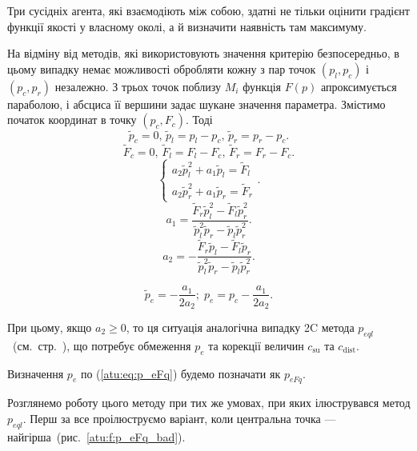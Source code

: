 Три сусідніх агента, які взаємодіють між собою, здатні не тільки оцінити градієнт
функції якості у власному околі, а й визначити наявність там
максимуму.

На відміну від методів, які використовують значення критерію безпосередньо, в
цьому випадку немає можливості обробляти кожну з пар точок $(p_l, p_c)$ і
$(p_c, p_r)$ незалежно. З трьох точок поблизу $M_{i}$ функція $F(p)$
апроксимується параболою, і абсциса її вершини задає шукане значення параметра.
Змістимо початок координат в точку
$(p_c, F_c)$. Тоді
%
\[
  \tilde{p}_c = 0, \,
  \tilde{p}_l = p_l - p_c, \,
  \tilde{p}_r = p_r - p_c.
\]
%
\[
  \tilde{F}_c = 0, \,
  \tilde{F}_l = F_l - F_c, \,
  \tilde{F}_r = F_r - F_c.
\]
%
\[
  \left\{
    \begin{array}{l}
      a_2 \tilde{p}_l^2 + a_1 \tilde{p}_l  = \tilde{F}_l
      \\
      a_2 \tilde{p}_r^2 + a_1 \tilde{p}_r  = \tilde{F}_r
    \end{array}
  \right. .
\]
%
\[
  a_1 = \frac{\tilde{F}_r \tilde{p}_l^2 - \tilde{F}_l \tilde{p}_r^2 }
             { \tilde{p}_l^2 \tilde{p}_r  - \tilde{p}_l \tilde{p}_r^2 }.
\]
%
\[
  a_2 = - \frac{\tilde{F}_r \tilde{p}_l - \tilde{F}_l \tilde{p}_r }
               { \tilde{p}_l^2 \tilde{p}_r  - \tilde{p}_l \tilde{p}_r^2 }.
\]

\begin{equation}
  \tilde{p}_e = - \frac{a_1}{2 a_2};
  \;
  p_e = p_c - \frac{a_1}{2 a_2}.
  \label{atu:eq:p_eFq}
\end{equation}

При цьому, якщо
$a_2 \ge 0$,
то ця ситуація аналогічна випадку 2C метода $p_{eql}$~(см.~стр.~\pageref{atu:d:p_eql_2A}),
що потребує обмеження $p_e$ та корекції величин $c_\mathrm{su}$ та $c_\mathrm{dist}$.

Визначення $p_e$ по (\ref{atu:eq:p_eFq}) будемо позначати як $p_{eFq}$.

Розглянемо роботу цього методу при тих же умовах, при яких
ілюструвався метод
$p_{eql}$. Перш за все проілюструємо варіант, коли центральна точка
--- найгірша~(рис.~\ref{atu:f:p_eFq_bad}).


